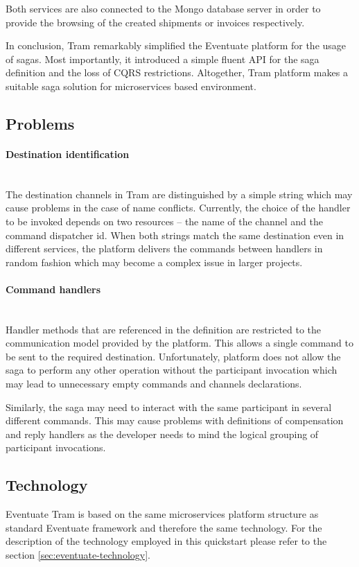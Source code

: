 \documentclass[oneside,
  digital, %
  table,   %
  nolof,     %
  nolot,     %
]{fithesis3}
\newcommand{\newlinepar}[1]{\paragraph{#1}\needspace{4\baselineskip}\mbox{}\\}
\begin{document}
Both services are also connected to the Mongo database server in order to provide the browsing of the created shipments or invoices respectively.

In conclusion, Tram remarkably simplified the Eventuate platform for the usage of sagas. Most importantly, it introduced a simple fluent API for the saga definition and the loss of CQRS restrictions. Altogether, Tram platform makes a suitable saga solution for microservices based environment.

\subsection{Problems}

\newlinepar{Destination identification}

The destination channels in Tram are distinguished by a simple string which may cause problems in the case of name conflicts. Currently, the choice of the handler to be invoked depends on two resources -- the name of the channel and the command dispatcher id. When both strings match the same destination even in different services, the platform delivers the commands between handlers in random fashion which may become a complex issue in larger projects.

\newlinepar{Command handlers}

Handler methods that are referenced in the definition are restricted to the communication model provided by the platform. This allows a single command to be sent to the required destination. Unfortunately, platform does not allow the saga to perform any other operation without the participant invocation which may lead to unnecessary empty commands and channels declarations. 

Similarly, the saga may need to interact with the same participant in several different commands. This may cause problems with definitions of compensation and reply handlers as the developer needs to mind the logical grouping of participant invocations.

\subsection{Technology}

Eventuate Tram is based on the same microservices platform structure as standard Eventuate framework and therefore the same technology. For the description of the technology employed in this quickstart please refer to the section \ref{sec:eventuate-technology}.
\end{document}
